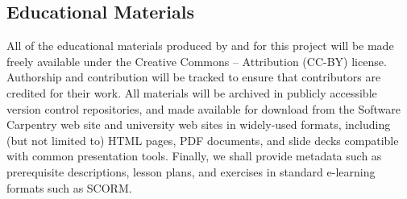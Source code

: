 \documentclass{proposalnsf}
\begin{document}
\subsection*{Educational Materials}

All of the educational materials produced by and for this project will
be made freely available under the Creative Commons -- Attribution
(CC-BY) license.  Authorship and contribution will be tracked to
ensure that contributors are credited for their work.  All materials
will be archived in publicly accessible version control repositories,
and made available for download from the Software Carpentry web site
and university web sites in widely-used formats, including (but not
limited to) HTML pages, PDF documents, and slide decks compatible with
common presentation tools.  Finally, we shall provide metadata such as
prerequisite descriptions, lesson plans, and exercises in standard
e-learning formats such as SCORM.
\end{document}
